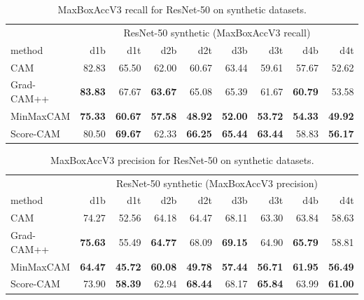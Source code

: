 \begin{table}[ht]
\centering
\begin{tabular}{lrrrrrrrr}
\toprule
 & \multicolumn{8}{c}{ResNet-50 synthetic (MaxBoxAccV3 recall)} \\
method & d1b & d1t & d2b & d2t & d3b & d3t & d4b & d4t \\
\cmidrule(lr){1-1} \cmidrule(lr){2-9}
CAM & 82.83 & 65.50 & 62.00 & 60.67 & 63.44 & 59.61 & 57.67 & 52.62 \\
Grad-CAM++ & \color{teal} \bfseries 83.83 & 67.67 & \color{teal} \bfseries 63.67 & 65.08 & 65.39 & 61.67 & \color{teal} \bfseries 60.79 & 53.58 \\
MinMaxCAM & \color{purple} \bfseries 75.33 & \color{purple} \bfseries 60.67 & \color{purple} \bfseries 57.58 & \color{purple} \bfseries 48.92 & \color{purple} \bfseries 52.00 & \color{purple} \bfseries 53.72 & \color{purple} \bfseries 54.33 & \color{purple} \bfseries 49.92 \\
Score-CAM & 80.50 & \color{teal} \bfseries 69.67 & 62.33 & \color{teal} \bfseries 66.25 & \color{teal} \bfseries 65.44 & \color{teal} \bfseries 63.44 & 58.83 & \color{teal} \bfseries 56.17 \\
\bottomrule
\end{tabular}
\caption[MaxBoxAccV3 recall for ResNet-50 on synthetic datasets]{MaxBoxAccV3 recall for ResNet-50 on synthetic datasets.}
\label{tab:maxboxaccv3_recall_resnet50_synthetic}
\end{table}

\begin{table}[ht]
\centering
\begin{tabular}{lrrrrrrrr}
\toprule
 & \multicolumn{8}{c}{ResNet-50 synthetic (MaxBoxAccV3 precision)} \\
method & d1b & d1t & d2b & d2t & d3b & d3t & d4b & d4t \\
\cmidrule(lr){1-1} \cmidrule(lr){2-9}
CAM & 74.27 & 52.56 & 64.18 & 64.47 & 68.11 & 63.30 & 63.84 & 58.63 \\
Grad-CAM++ & \color{teal} \bfseries 75.63 & 55.49 & \color{teal} \bfseries 64.77 & 68.09 & \color{teal} \bfseries 69.15 & 64.90 & \color{teal} \bfseries 65.79 & 58.81 \\
MinMaxCAM & \color{purple} \bfseries 64.47 & \color{purple} \bfseries 45.72 & \color{purple} \bfseries 60.08 & \color{purple} \bfseries 49.78 & \color{purple} \bfseries 57.44 & \color{purple} \bfseries 56.71 & \color{purple} \bfseries 61.95 & \color{purple} \bfseries 56.49 \\
Score-CAM & 73.90 & \color{teal} \bfseries 58.39 & 62.94 & \color{teal} \bfseries 68.44 & 68.17 & \color{teal} \bfseries 65.84 & 63.99 & \color{teal} \bfseries 61.00 \\
\bottomrule
\end{tabular}
\caption[MaxBoxAccV3 precision for ResNet-50 on synthetic datasets]{MaxBoxAccV3 precision for ResNet-50 on synthetic datasets.}
\label{tab:maxboxaccv3_precision_resnet50_synthetic}
\end{table}

